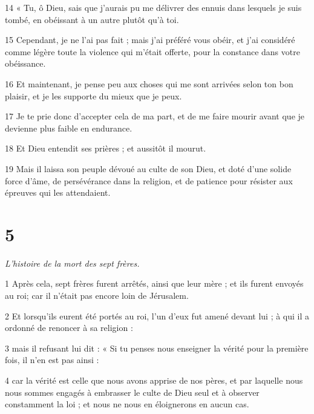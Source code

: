 \par 14 « Tu, ô Dieu, sais que j'aurais pu me délivrer des ennuis dans lesquels je suis tombé, en obéissant à un autre plutôt qu'à toi.

\par 15 Cependant, je ne l'ai pas fait ; mais j'ai préféré vous obéir, et j'ai considéré comme légère toute la violence qui m'était offerte, pour la constance dans votre obéissance.

\par 16 Et maintenant, je pense peu aux choses qui me sont arrivées selon ton bon plaisir, et je les supporte du mieux que je peux.

\par 17 Je te prie donc d'accepter cela de ma part, et de me faire mourir avant que je devienne plus faible en endurance.

\par 18 Et Dieu entendit ses prières ; et aussitôt il mourut.

\par 19 Mais il laissa son peuple dévoué au culte de son Dieu, et doté d'une solide force d'âme, de persévérance dans la religion, et de patience pour résister aux épreuves qui les attendaient.

\chapter{5}

\par \textit{L'histoire de la mort des sept frères.}

\par 1 Après cela, sept frères furent arrêtés, ainsi que leur mère ; et ils furent envoyés au roi; car il n'était pas encore loin de Jérusalem.

\par 2 Et lorsqu'ils eurent été portés au roi, l'un d'eux fut amené devant lui ; à qui il a ordonné de renoncer à sa religion :

\par 3 mais il refusant lui dit : « Si tu penses nous enseigner la vérité pour la première fois, il n'en est pas ainsi :

\par 4 car la vérité est celle que nous avons apprise de nos pères, et par laquelle nous nous sommes engagés à embrasser le culte de Dieu seul et à observer constamment la loi ; et nous ne nous en éloignerons en aucun cas.

